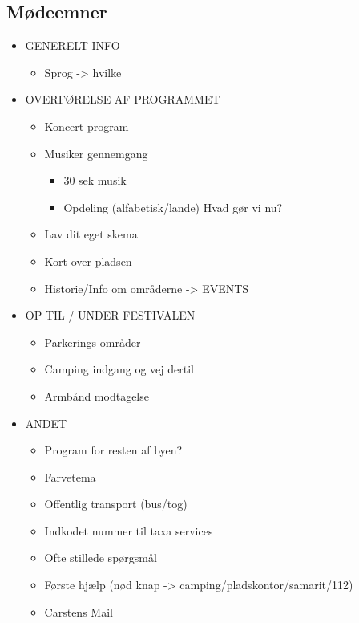 \documentclass[a4paper,10pt,titlepage]{article}
\begin{document}
\subsection{Mødeemner}
\begin{itemize}
\item
GENERELT INFO
\begin{itemize}
\item
Sprog -> hvilke
\end{itemize}
\item
OVERFØRELSE AF PROGRAMMET
\begin{itemize}
\item
Koncert program
\item
Musiker gennemgang
\begin{itemize}
\item
30 sek musik
\item
Opdeling (alfabetisk/lande) Hvad gør vi nu?
\end{itemize}
\item
Lav dit eget skema
\item
Kort over pladsen
\item
Historie/Info om områderne -> EVENTS
\end{itemize}
\item
OP TIL / UNDER FESTIVALEN
\begin{itemize}
\item
Parkerings områder
\item
Camping indgang og vej dertil
\item
Armbånd modtagelse
\end{itemize}
\item
ANDET
\begin{itemize}
\item
Program for resten af byen?
\item
Farvetema
\item
Offentlig transport (bus/tog)
\item
Indkodet nummer til taxa services
\item
Ofte stillede spørgsmål
\item
Første hjælp  (nød knap -> camping/pladskontor/samarit/112)
\item
Carstens Mail
\end{itemize}
\end{itemize}
\newpage
\end{document}
